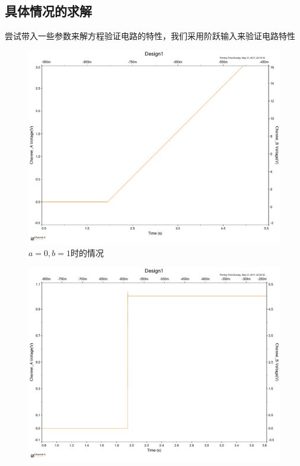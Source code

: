 \documentclass[UTF8,a4paper]{paper}
\begin{document}
\subsection{具体情况的求解}
尝试带入一些参数来解方程验证电路的特性，我们采用阶跃输入来验证电路特性

\begin{multicols}{2}
\begin{figure}[H]
\centering
\includegraphics[width=\columnwidth]{a0b1.pdf}
\caption{$a=0,b=1$时的情况}
\label{a0b1}
\end{figure}
\begin{figure}[H]
\centering
\includegraphics[width=\columnwidth]{a1b0.pdf}

\end{figure}
\end{multicols}
\end{document}
